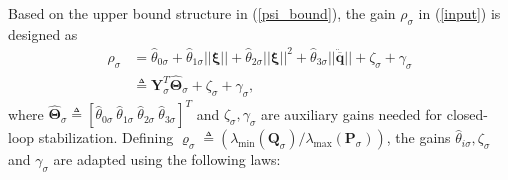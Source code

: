 Based on the upper bound structure in (\ref{psi_bound}), the gain $\rho_{\sigma}$ in (\ref{input}) is designed as
\begin{align}
\rho_{\sigma} &= \hat{\theta}_{0 \sigma}+ \hat{\theta}_{1 \sigma} ||  \boldsymbol{ \xi} ||+ \hat{\theta}_{2\sigma}||  \boldsymbol{ \xi} ||^2 +\hat{\theta}_{3 \sigma} || \ddot{\overline{\mathbf{q}}}|| +\zeta_\sigma+ \gamma_\sigma \nonumber\\
&\triangleq \mathbf{Y}^T_{\sigma}\hat{\boldsymbol \Theta}_{\sigma}+ \zeta_\sigma+ \gamma_\sigma, \label{rho}
\end{align}
where $\hat{\boldsymbol \Theta}_{\sigma} \triangleq [\hat{\theta}_{0\sigma} ~ \hat{\theta}_{1\sigma} ~\hat{\theta}_{2\sigma}~ \hat{\theta}_{3 \sigma}]^T$ and $\zeta_\sigma, \gamma_\sigma$ are auxiliary gains needed for closed-loop stabilization. 
Defining $\varrho_\sigma \triangleq ({\lambda_{\min}( \mathbf{Q}_{\sigma} )}/{\lambda_{\max}( \mathbf{P}_{\sigma} )})$, the gains $\hat{\theta}_{i\sigma}, \zeta_\sigma$ and $ \gamma_{\sigma}$ are adapted using the following laws:
